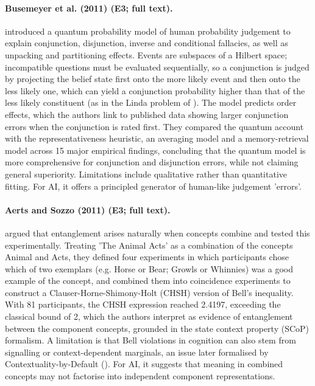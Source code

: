 \documentclass[10pt,a4paper]{article}
\begin{document}
\paragraph{Busemeyer et al. (2011) (E3; full text).} \citet{Busemeyer2011} introduced a quantum probability model of human probability judgement to explain conjunction, disjunction, inverse and conditional fallacies, as well as unpacking and partitioning effects. Events are subspaces of a Hilbert space; incompatible questions must be evaluated sequentially, so a conjunction is judged by projecting the belief state first onto the more likely event and then onto the less likely one, which can yield a conjunction probability higher than that of the less likely constituent (as in the Linda problem of \citep{Tversky1983}). The model predicts order effects, which the authors link to published data showing larger conjunction errors when the conjunction is rated first. They compared the quantum account with the representativeness heuristic, an averaging model and a memory-retrieval model across 15 major empirical findings, concluding that the quantum model is more comprehensive for conjunction and disjunction errors, while not claiming general superiority. Limitations include qualitative rather than quantitative fitting. For AI, it offers a principled generator of human-like judgement 'errors'.

\paragraph{Aerts and Sozzo (2011) (E3; full text).} \citet{Aerts2011a} argued that entanglement arises naturally when concepts combine and tested this experimentally. Treating 'The Animal Acts' as a combination of the concepts Animal and Acts, they defined four experiments in which participants chose which of two exemplars (e.g. Horse or Bear; Growls or Whinnies) was a good example of the concept, and combined them into coincidence experiments to construct a Clauser-Horne-Shimony-Holt (CHSH) version of Bell's inequality. With 81 participants, the CHSH expression reached 2.4197, exceeding the classical bound of 2, which the authors interpret as evidence of entanglement between the component concepts, grounded in the state context property (SCoP) formalism. A limitation is that Bell violations in cognition can also stem from signalling or context-dependent marginals, an issue later formalised by Contextuality-by-Default (\citep{Dzhafarov2016a}). For AI, it suggests that meaning in combined concepts may not factorise into independent component representations.
\end{document}
